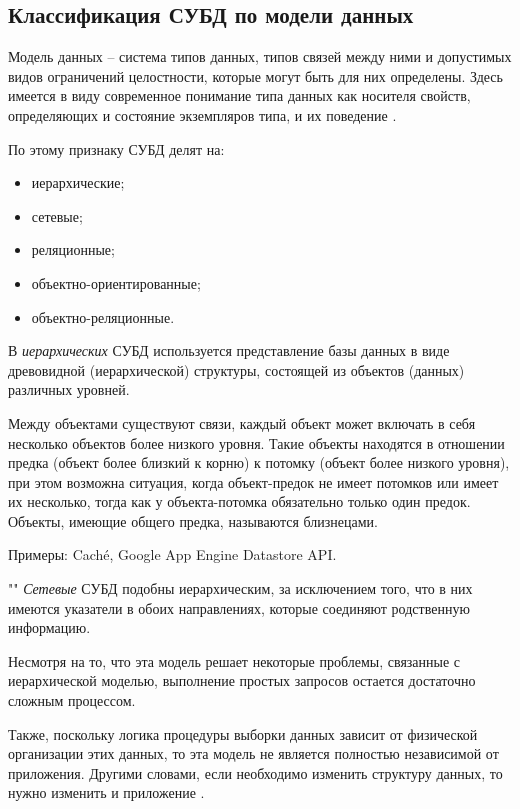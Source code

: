 \documentclass[a4paper,14pt]{extreport}
\begin{document}
\subsection{Классификация СУБД по модели данных}

Модель данных --  система типов данных, типов связей между ними и допустимых видов ограничений целостности, которые могут быть для них определены. Здесь имеется в виду современное понимание типа данных как носителя свойств, определяющих и состояние экземпляров типа, и их поведение \cite{kogal}.

По этому признаку СУБД делят на:

\begin{itemize}
	\setlength\itemsep{0.05em}
	\item иерархические;
	\item сетевые;
	\item реляционные;
	\item объектно-ориентированные;
	\item объектно-реляционные.
\end{itemize}

В \textit{иерархических} СУБД используется представление базы данных в виде древовидной (иерархической) структуры, состоящей из объектов (данных) различных уровней.

Между объектами существуют связи, каждый объект может включать в себя несколько объектов более низкого уровня. Такие объекты находятся в отношении предка (объект более близкий к корню) к потомку (объект более низкого уровня), при этом возможна ситуация, когда объект-предок не имеет потомков или имеет их несколько, тогда как у объекта-потомка обязательно только один предок. Объекты, имеющие общего предка, называются близнецами.

Примеры: Caché, Google App Engine Datastore API.

""\newline
\indent\textit{Сетевые} СУБД подобны иерархическим, за исключением того, что в них имеются указатели в обоих направлениях, которые соединяют родственную информацию.

Несмотря на то, что эта модель решает некоторые проблемы, связанные с иерархической моделью, выполнение простых запросов остается достаточно сложным процессом.

Также, поскольку логика процедуры выборки данных зависит от физической организации этих данных, то эта модель не является полностью независимой от приложения. Другими словами, если необходимо изменить структуру данных, то нужно изменить и приложение \cite{scienceforum}.
\end{document}
